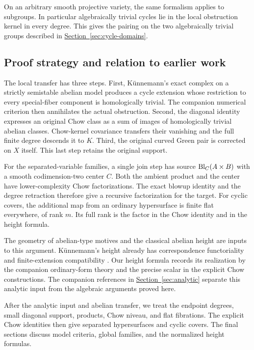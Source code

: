 \documentclass[11pt,a4paper]{article}
\theoremstyle{definition}
\theoremstyle{remark}\newtheorem{remark}[theorem]{Remark}
\numberwithin{equation}{section}
\newcommand{\secref}[1]{\hyperref[#1]{\textcolor{sectionlink}{Section~\ref*{#1}}}}
\begin{document}
On an arbitrary smooth projective variety, the same formalism applies
to subgroups. In particular algebraically trivial cycles lie in the
local obstruction kernel in every degree. This gives the pairing on
the two algebraically trivial groups described in
\secref{sec:cycle-domains}.



\subsection{Proof strategy and relation to earlier work}

The local transfer has three steps. First, K\"unnemann's exact complex on
a strictly semistable abelian model produces a cycle extension whose
restriction to every special-fiber component is homologically trivial.
The companion numerical criterion then annihilates the actual
obstruction. Second, the diagonal identity expresses an original Chow
class as a sum of images of homologically trivial abelian classes.
Chow-kernel covariance transfers their vanishing and the full finite
degree descends it to $K$. Third, the original curved Green pair is
corrected on $X$ itself. This last step retains the original support.

For the separated-variable families, a single join step has source
$\operatorname{Bl}_C(A\times B)$ with a smooth codimension-two center $C$. Both the
ambient product and the center have lower-complexity Chow factorizations.
The exact blowup identity and the degree retraction therefore give a
recursive factorization for the target. For cyclic covers, the additional
map from an ordinary hypersurface is finite flat everywhere, of rank $m$.
Its full rank is the factor in the Chow identity and in the height formula.

The geometry of abelian-type motives and the classical abelian height are
inputs to this argument. K\"unnemann's height already has correspondence
functoriality and finite-extension compatibility \cite[\S1]{Kun}. Our
height formula records its realization by the companion ordinary-form
theory and the precise scalar in the explicit Chow constructions.
The companion references in \secref{sec:analytic} separate this analytic
input from the algebraic arguments proved here.

After the analytic input and abelian transfer, we treat the endpoint
degrees, small diagonal support, products, Chow niveau, and flat
fibrations. The explicit Chow identities then give separated hypersurfaces
and cyclic covers. The final sections discuss model criteria, global
families, and the normalized height formulas.
\end{document}
